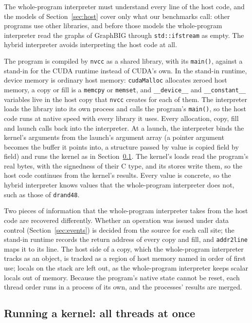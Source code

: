 \documentclass[11pt]{article}
\newcommand{\secref}[1]{Section~\ref{#1}}
\newcommand{\code}[1]{\texttt{#1}}
\begin{document}
The whole-program interpreter must understand every line of the host code, and the models of
\secref{sec:host} cover only what our benchmarks call: other programs use other libraries, and before those models
the whole-program interpreter read the graphs of GraphBIG through \code{std::ifstream} as empty. The hybrid
interpreter avoids interpreting the host code at all.

The program is compiled by \code{nvcc} as a shared library, with its \code{main()}, against a stand-in for the CUDA
runtime instead of CUDA's own. In the stand-in runtime, device memory is ordinary host memory: \code{cudaMalloc}
allocates zeroed host memory, a copy or fill is a \code{memcpy} or \code{memset}, and \code{\_\_device\_\_} and
\code{\_\_constant\_\_} variables live in the host copy that \code{nvcc} creates for each of them. The interpreter loads
the library into its own process and calls the program's \code{main()}, so the host code runs at native speed with
every library it uses. Every allocation, copy, fill and launch calls back into the interpreter. At a launch, the
interpreter binds the kernel's arguments from the launch's argument array (a pointer argument becomes the buffer it
points into, a structure passed by value is copied field by field) and runs the kernel as in \secref{sec:kernels}.
The kernel's loads read the program's real bytes, with the signedness of their C type, and its stores write them, so
the host code continues from the kernel's results. Every value is concrete, so the hybrid interpreter knows values
that the whole-program interpreter does not, such as those of \code{drand48}.

Two pieces of information that the whole-program interpreter takes from the host code are recovered differently.
Whether an operation was issued under data control (\secref{sec:events}) is decided from the source for each call
site; the stand-in runtime records the return address of every copy and fill, and \code{addr2line} maps it to its
line. The host side of a copy, which the whole-program interpreter tracks as an object, is tracked as a region of
host memory named in order of first use; locals on the stack are left out, as the whole-program interpreter keeps
scalar locals out of memory. Because the program's native state cannot be reset, each thread order runs in a
process of its own, and the processes' results are merged.

\subsection{Running a kernel: all threads at once}
\label{sec:kernels}
\end{document}
